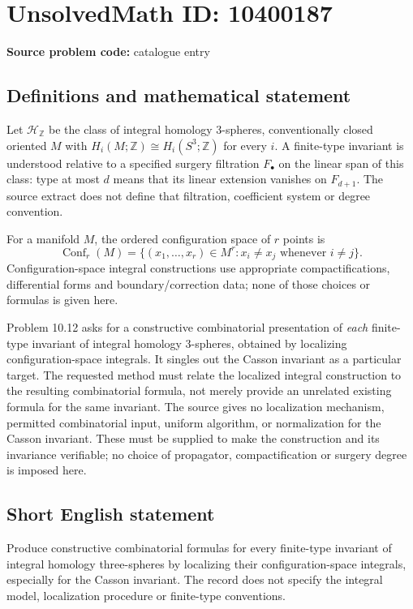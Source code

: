 \documentclass[11pt]{article}
\newcommand{\Z}{\mathbb{Z}}
\begin{document}
\section*{UnsolvedMath ID: 10400187}
\textbf{Source problem code:} catalogue entry
\subsection{Definitions and mathematical statement}
Let \(\mathcal H_{\Z}\) be the class of integral homology \(3\)-spheres, conventionally closed oriented \(M\) with \(H_i(M;\Z)\cong H_i(S^3;\Z)\) for every \(i\). A finite-type invariant is understood relative to a specified surgery filtration \(F_\bullet\) on the linear span of this class: type at most \(d\) means that its linear extension vanishes on \(F_{d+1}\). The source extract does not define that filtration, coefficient system or degree convention.

For a manifold \(M\), the ordered configuration space of \(r\) points is
\[
 \operatorname{Conf}_r(M)=
 \{(x_1,\ldots,x_r)\in M^r:x_i\ne x_j\text{ whenever }i\ne j\}.
\]
Configuration-space integral constructions use appropriate compactifications, differential forms and boundary/correction data; none of those choices or formulas is given here.

Problem 10.12 asks for a constructive combinatorial presentation of \emph{each} finite-type invariant of integral homology \(3\)-spheres, obtained by localizing configuration-space integrals. It singles out the Casson invariant as a particular target. The requested method must relate the localized integral construction to the resulting combinatorial formula, not merely provide an unrelated existing formula for the same invariant. The source gives no localization mechanism, permitted combinatorial input, uniform algorithm, or normalization for the Casson invariant. These must be supplied to make the construction and its invariance verifiable; no choice of propagator, compactification or surgery degree is imposed here.
\subsection{Short English statement}
Produce constructive combinatorial formulas for every finite-type invariant of integral homology three-spheres by localizing their configuration-space integrals, especially for the Casson invariant. The record does not specify the integral model, localization procedure or finite-type conventions.
\end{document}

